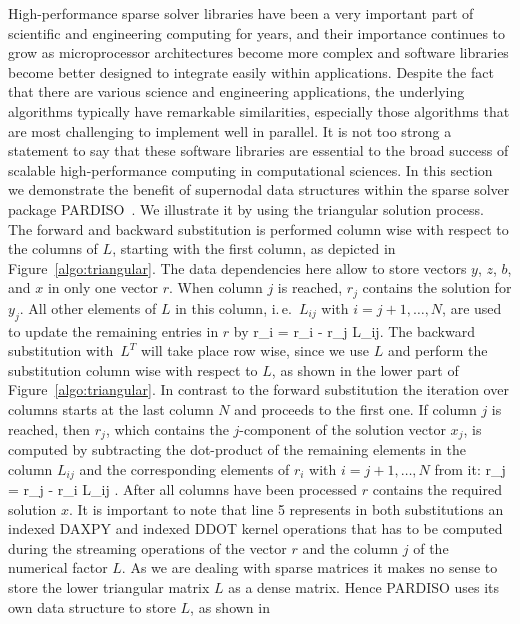 High-performance sparse solver libraries have been a very important part of
scientific and engineering computing for years, and their importance
continues to grow as microprocessor architectures become more complex
and software libraries become better designed to integrate easily
within applications. Despite the fact that there are various science
and engineering applications, the underlying algorithms typically have
remarkable similarities, especially those algorithms that are most
challenging to implement well in parallel. It is not too strong a
statement to say that these software libraries are essential to the
broad success of scalable high-performance computing in computational
sciences.  In this section we demonstrate the benefit of supernodal data structures within the 
sparse solver package PARDISO~\cite{schenk-2004}. We illustrate it by using 
the triangular solution process. The forward and backward substitution is performed
column wise with respect to the columns of $L$, starting with the
first column, as depicted in Figure~\ref{algo:triangular}.
The data dependencies here allow to store vectors $y$, $z$, $b$, and $x$ in only one
vector $r$. When column $j$ is reached, $r_j$ contains the solution for $y_j$. 
All other elements of $L$ in this column, i.\,e.\ $L_{ij}$ with $i = j + 1,
\ldots, N$, are used to update the remaining entries in $r$ by 
%
\be
  r_i = r_i - r_j L_{ij}.
  \label{eq:algo:fw:pardiso}
\ee
%
The backward substitution with~$L^T$ will take place row wise, since we
use $L$ and perform the substitution column wise with respect to $L$, as shown in the lower part of
Figure~\ref{algo:triangular}.  In contrast to the forward substitution the
iteration over columns starts at the last column $N$ and proceeds to
the first one.  If column $j$ is reached, then $r_j$, which contains the $j$-component of the solution vector $x_j$,
is computed by subtracting the dot-product of the remaining elements in
the column $L_{ij}$ and the corresponding elements of $r_i$ with $i =
j + 1, \ldots, N$ from it:
%
\be
  r_j = r_j - r_i L_{ij} .
  \label{eq:algo:bw:pardiso}
\ee
%
After all columns have been processed $r$ contains the required solution $x$. It is important to note that
line 5 represents in both substitutions an indexed DAXPY and indexed
DDOT kernel operations that has to be computed during the streaming 
operations of the vector $r$ and the column $j$ of the numerical factor $L$. 
As we are dealing with sparse matrices it makes no sense to store the lower
triangular matrix $L$ as a dense matrix.
Hence PARDISO uses its own data structure to store $L$, as shown in
